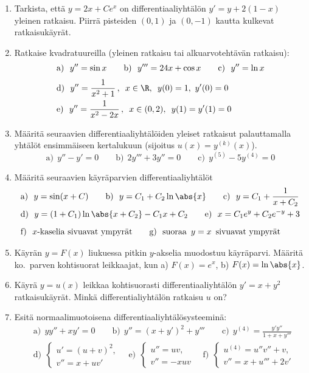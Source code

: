 \Harj
\begin{enumerate}

\item
Tarkista, että $y=2x+Ce^{x}$ on differentiaaliyhtälön $y'=y+2(1-x)$ yleinen ratkaisu. Piirrä
pisteiden $(0,1)$ ja $(0,-1)$ kautta kulkevat ratkaisukäyrät.

\item
Ratkaise kvadratuureilla (yleinen ratkaisu tai alkuarvotehtävän ratkaisu):
\begin{align*}
&\text{a)}\ \ y''=\sin x \qquad
 \text{b)}\ \ y'''=24x+\cos x \qquad
 \text{c)}\ \ y''=\ln x \\[1mm]
&\text{d)}\ \ y''=\frac{1}{x^2+1}\,,\,\ x\in\R,\,\ y(0)=1,\ y'(0)=0 \\
&\text{e)}\ \ y''=\frac{1}{x^2-2x}\,,\,\ x\in(0,2),\,\ y(1)=y'(1)=0
\end{align*}

\item Määritä seuraavien differentiaaliyhtälöiden yleiset ratkaisut palauttamalla yhtälöt
ensimmäiseen kertalukuun (sijoitus $u(x)=y^{(k)}(x)$).
\[
\text{a)}\ \ y''-y'=0 \qquad
\text{b)}\ \ 2y'''+3y''=0 \qquad
\text{c)}\ \ y^{(5)}-5y^{(4)} = 0
\]

\item
Määritä seuraavien käyräparvien differentiaaliyhtälöt
\begin{align*}
&\text{a)}\ \ y=\sin(x+C) \qquad
 \text{b)}\ \ y=C_1+C_2\ln\abs{x} \qquad
 \text{c)}\ \ y=C_1+\frac{1}{x+C_2} \\
&\text{d)}\ \ y=(1+C_1)\ln\abs{x+C_2}-C_1 x+C_2 \qquad
 \text{e)}\ \ x=C_1e^y+C_2e^{-y}+3 \\[2mm]
&\text{f)}\ \ \text{$x$-kaselia sivuavat ympyrät} \qquad
 \text{g)}\ \ \text{suoraa $\,y=x\,$ sivuavat ympyrät}
\end{align*}

\item 
Käyrän $y=F(x)$ liukuessa pitkin $y$-akselia muodostuu käyräparvi. Määritä ko.\ parven
kohtisuorat leikkaajat, kun a) $F(x)=e^x$, b) $F(x)=\ln\abs{x}$.

\item
Käyrä $y=u(x)$ leikkaa kohtisuorasti differentiaaliyhtälön $y'=x+y^2$ ratkaisukäyrät.
Minkä differentialiyhtälön ratkaisu $u$ on?

\item
Esitä normaalimuotoisena differentiaaliyhtälösysteeminä:
\begin{align*}
&\text{a)}\ \ yy''+xy'=0 \qquad
 \text{b)}\ \ y''=(x+y')^2+y''' \qquad
 \text{c)}\ \ y^{(4)}=\frac{y'y''}{1+x+y'''} \\
&\text{d)}\ \ \begin{cases} u'=(u+v)^2, \\ v''=x+uv' \end{cases} \quad
 \text{e)}\ \ \begin{cases} u''=uv, \\ v''=-xuv \end{cases} \quad
 \text{f)}\ \ \begin{cases} u^{(4)}=u''v''+v, \\ v''=x+u'''+2v' \end{cases}
\end{align*}


\end{enumerate}
